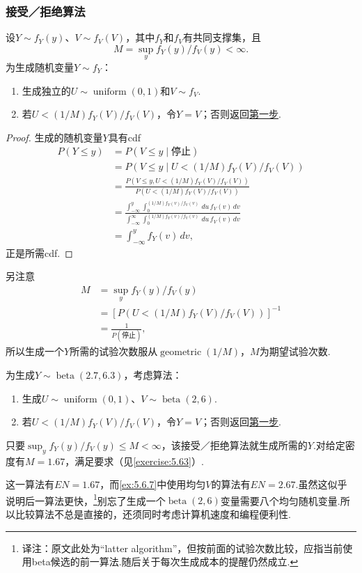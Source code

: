 \subsubsection{接受／拒绝算法}\label{sec:5.6.3}
\begin{theorem}\label{thm:5.6.8}
设$Y\sim f_Y(y)$、$V\sim f_V(V)$，其中$f_Y$和$f_V$有共同支撑集，且
$$M=\sup_y f_Y(y)/f_V(y)<\infty.$$
为生成随机变量$Y\sim f_Y$：
\begin{enumerate}[label=\textbf{\alph*.}]
\item\label{item:5.6.8a} 生成独立的$U\sim\operatorname{uniform}(0,1)$和$V\sim f_V$.
\item 若$U<(1/M)f_Y(V)/f_V(V)$，令$Y=V$；否则返回\hyperref[item:5.6.8a]{第一步}.
\end{enumerate}
\end{theorem}
\begin{proof}
生成的随机变量$Y$具有cdf
\begin{align*}
P(Y\le y)&=P(V\le y\mid\text{停止})\\
&=P(V\le y\mid U<(1/M)f_Y(V)/f_V(V))\\
&=\frac{P(V\le y,U<(1/M)f_Y(V)/f_V(V))}{P(U<(1/M)f_Y(V)/f_V(V))}\\
&=\frac{\displaystyle\int_{-\infty}^y\int_0^{(1/M)f_Y(v)/f_V(v)}\,du\,f_V(v)\,dv}{\displaystyle\int_{-\infty}^\infty\int_0^{(1/M)f_Y(v)/f_V(v)}\,du\,f_V(v)\,dv}\\
&=\int_{-\infty}^y f_Y(v)\,dv,
\end{align*}
正是所需cdf.
\end{proof}
另注意
$$\begin{aligned}
M&=\sup_yf_Y(y)/f_V(y)\\
&=[P(U<(1/M)f_Y(V)/f_V(V))]^{-1}\\
&=\frac1{P(\text{停止})},
\end{aligned}$$
所以生成一个$Y$所需的试验次数服从$\operatorname{geometric}(1/M)$，$M$为期望试验次数.
\begin{example}[beta随机变量的生成——II]\label{ex:5.6.9}
为生成$Y\sim\operatorname{beta}(2.7,6.3)$，考虑算法：
\begin{enumerate}[label=\textbf{\alph*.}]
\item\label{item:5.6.9a} 生成$U\sim\operatorname{uniform}(0,1)$、$V\sim\operatorname{beta}(2,6)$.
\item 若$U<(1/M)f_Y(V)/f_V(V)$，令$Y=V$；否则返回\hyperref[item:5.6.9a]{第一步}.
\end{enumerate}
只要$\sup_y f_Y(y)/f_V(y)\le M<\infty$，该接受／拒绝算法就生成所需的$Y$.对给定密度有$M=1.67$，满足要求（见\autoref{exercise:5.63}）.

这一算法有$EN=1.67$，而\autoref{ex:5.6.7}中使用均匀$V$的算法有$EN=2.67$.虽然这似乎说明后一算法更快，\footnote{译注：原文此处为“latter algorithm”，但按前面的试验次数比较，应指当前使用beta候选的前一算法.随后关于每次生成成本的提醒仍然成立.}别忘了生成一个$\operatorname{beta}(2,6)$变量需要八个均匀随机变量.所以比较算法不总是直接的，还须同时考虑计算机速度和编程便利性.
\end{example}
